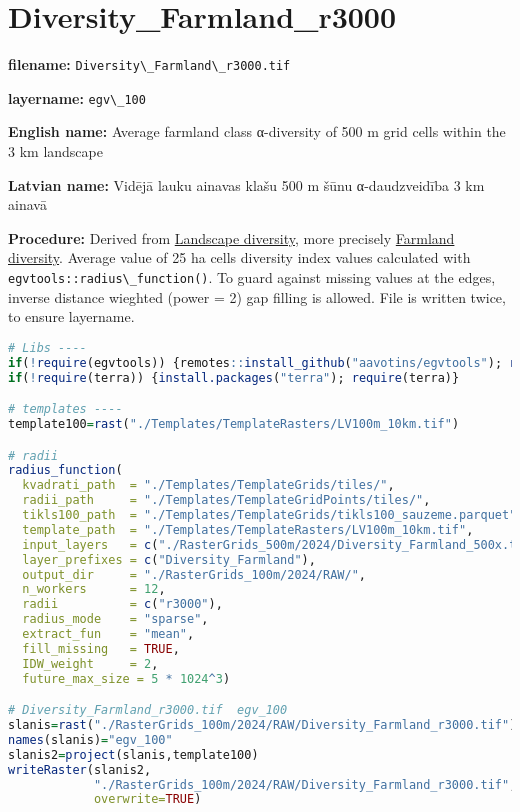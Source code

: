 \documentclass[
]{book}
\newcommand{\passthrough}[1]{#1}
\begin{document}
\section{Diversity\_Farmland\_r3000}\label{ch06.100}

\textbf{filename:} \passthrough{\lstinline!Diversity\_Farmland\_r3000.tif!}

\textbf{layername:} \passthrough{\lstinline!egv\_100!}

\textbf{English name:} Average farmland class α-diversity of 500 m grid cells within the 3 km landscape

\textbf{Latvian name:} Vidējā lauku ainavas klašu 500 m šūnu α-daudzveidība 3 km ainavā

\textbf{Procedure:} Derived from \hyperref[Ch05.04]{Landscape diversity}, more precisely
\hyperref[Ch05.04.0]{Farmland diversity}. Average value of 25 ha
cells diversity index values calculated with \passthrough{\lstinline!egvtools::radius\_function()!}. To
guard against missing values at the edges, inverse distance wieghted (power = 2)
gap filling is allowed. File is written twice, to ensure layername.

\begin{lstlisting}[language=R]
# Libs ----
if(!require(egvtools)) {remotes::install_github("aavotins/egvtools"); require(egvtools)}
if(!require(terra)) {install.packages("terra"); require(terra)}

# templates ----
template100=rast("./Templates/TemplateRasters/LV100m_10km.tif")

# radii
radius_function(
  kvadrati_path  = "./Templates/TemplateGrids/tiles/",
  radii_path     = "./Templates/TemplateGridPoints/tiles/",
  tikls100_path  = "./Templates/TemplateGrids/tikls100_sauzeme.parquet",
  template_path  = "./Templates/TemplateRasters/LV100m_10km.tif",
  input_layers   = c("./RasterGrids_500m/2024/Diversity_Farmland_500x.tif"),
  layer_prefixes = c("Diversity_Farmland"),
  output_dir     = "./RasterGrids_100m/2024/RAW/",
  n_workers      = 12,
  radii          = c("r3000"),
  radius_mode    = "sparse",
  extract_fun    = "mean",
  fill_missing   = TRUE,
  IDW_weight     = 2,
  future_max_size = 5 * 1024^3)

# Diversity_Farmland_r3000.tif  egv_100
slanis=rast("./RasterGrids_100m/2024/RAW/Diversity_Farmland_r3000.tif")
names(slanis)="egv_100"
slanis2=project(slanis,template100)
writeRaster(slanis2,
            "./RasterGrids_100m/2024/RAW/Diversity_Farmland_r3000.tif",
            overwrite=TRUE)
\end{lstlisting}
\end{document}
